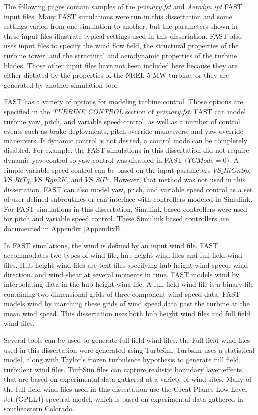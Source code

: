 The following pages contain samples of the \textit{primary.fst} and \textit{Aerodyn.ipt} FAST input files. Many FAST simulations were run in this dissertation and some settings varied from one simulation to another, but the parameters shown in these input files illustrate typical settings used in this dissertation. FAST also uses input files to specify the wind flow field, the structural properties of the turbine tower,  and the structural and aerodynamic properties of the turbine blades. Those other input files have not been included here because they are either dictated by the properties of the NREL 5-MW turbine, or they are generated by another simulation tool.

FAST has a variety of options for modeling turbine control. Those options are specified in the \textit{TURBINE CONTROL} section of \textit{primary.fst}. FAST can model turbine yaw, pitch, and variable speed control, as well as a number of control events such as brake deployments, pitch override maneuvers, and yaw override maneuvers. If dynamic control is not desired, a control mode can be completely disabled. For example, the FAST simulations in this dissertation did not require dynamic yaw control so yaw control was disabled in FAST ($YCMode = 0$). A simple variable speed control can be based on the input parameters $VS\_RtGnSp$, $VS\_RtTq$, $VS\_Rgn2K$, and $VS\_SlPc$. However, that method was not used in this dissertation. FAST can also model yaw, pitch, and variable speed control as a set of user defined subroutines or can interface with controllers modeled in Simulink. For FAST simulations in this dissertation, Simulink based controllers were used for pitch and variable speed control. These Simulink based controllers are documented in Appendix \ref{AppendixB}.

In FAST simulations, the wind is defined by an input wind file. FAST accommodates two types of wind file, hub height wind files and full field wind files. Hub height wind files are text files specifying hub height wind speed, wind direction, and wind shear at several moments in time. FAST models wind by interpolating data in the hub height wind file. A full field wind file is a binary file containing two dimensional grids of three component wind speed data. FAST models wind by marching these grids of wind speed data past the turbine at the mean wind speed. This dissertation uses both hub height wind files and full field wind files.

Several tools can be used to generate full field wind files. the Full field wind files used in this dissertation were generated using TurbSim.\cite{jonkman2012} Turbsim uses a statistical model, along with Taylor's frozen turbulence hypothesis to generate full field, turbulent wind files. TurbSim files can capture realistic boundary layer effects that are based on experimental data gathered at a variety of wind sites. Many of the full field wind files used in this dissertation use the Great Planes Low Level Jet (GPLLJ) spectral model, which is based on experimental data gathered in southeastern Colorado.


